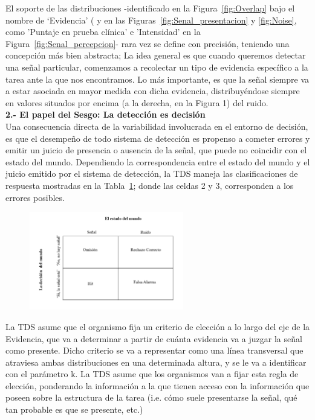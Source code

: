 El soporte de las distribuciones -identificado en la Figura~\ref{fig:Overlap} bajo el nombre de ‘Evidencia’ ( y en las Figuras~\ref{fig:Senal_presentacion} y \ref{fig:Noise}, como 'Puntaje en prueba clínica' e 'Intensidad' en la Figura~\ref{fig:Senal_percepcion}- rara vez se define con precisión,  teniendo una concepción más bien abstracta; La idea general es que cuando queremos detectar una señal particular, comenzamos a recolectar un tipo de evidencia específico a la tarea ante la que nos encontramos. Lo más importante, es que la señal siempre va a estar asociada en mayor medida con dicha evidencia, distribuyéndose siempre en valores situados por encima (a la derecha, en la Figura 1) del ruido.\\
 
  \textbf{2.- El papel del Sesgo: La detección es decisión}\\

Una consecuencia directa de la variabilidad involucrada en el entorno de decisión, es que el desempeño de todo sistema de detección es propenso a cometer errores y emitir un juicio de presencia o ausencia de la señal, que puede no coincidir con el estado del mundo. Dependiendo la correspondencia entre el estado del mundo y el juicio emitido por el sistema de detección, la TDS maneja las clasificaciones de respuesta mostradas en la Tabla~\ref{fig:Mat_Output}; donde las celdas 2 y 3, corresponden a los errores posibles.\\

\begin{figure}[th]
\centering
\includegraphics[width=0.60\textwidth]{Figures/Matriz_Outputs} 
\caption[Posibles Resultados en una Tarea de Detección]{}
\label{fig:Mat_Output}
\end{figure}

La TDS asume que el organismo fija un criterio de elección a lo largo del eje de la Evidencia, que va a determinar a partir de cuánta evidencia va a juzgar la señal como presente. Dicho criterio se va a representar como una línea transversal que atraviesa ambas distribuciones en una determinada altura, y se le va a identificar con el parámetro k. La TDS asume que los organismos van a fijar esta regla de elección, ponderando la información a la que tienen acceso con la información que poseen sobre la estructura de la tarea (i.e. cómo suele presentarse la señal, qué tan probable es que se presente, etc.)\\


